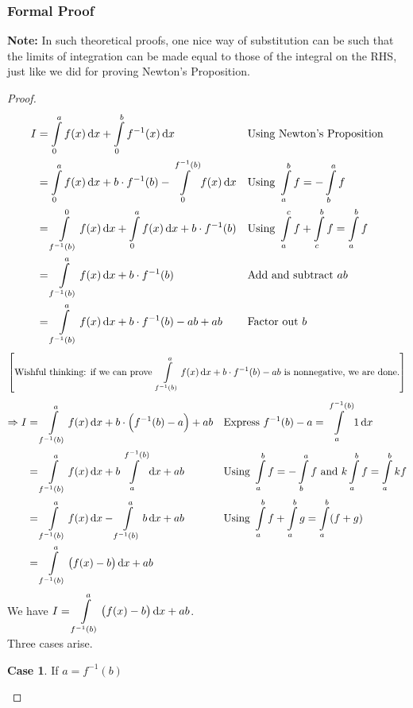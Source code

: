 \documentclass[14]{article}
\theoremstyle{definition}
\theoremstyle{case}
\newtheorem{case}{Case}
\begin{document}
\subsubsection{Formal Proof}
\textbf{Note:} In such theoretical proofs, one nice way of substitution can be such that the limits of integration can be made equal to those of the integral on the RHS, just like we did for proving Newton's Proposition.\\
\begin{proof}
\begin{align*}
I &= \int\limits_0^a f(x) \dif x + \int\limits_0^b f^{-1}(x) \dif x  && \text{Using Newton's Proposition}\\
&= \int\limits_0^a f(x) \dif x + b \cdot f^{-1}(b) - \int\limits_0^{f^{-1}(b)}f(x) \dif x && \text{Using } \int\limits_a^b f = - \int\limits_b^a f\\
&= \int\limits_{f^{-1}(b)}^0 f(x) \dif x + \int\limits_0^a f(x) \dif x + b \cdot f^{-1}(b) && \text{Using } \int\limits_a^c f + \int\limits_c^b f = \int\limits_a^b f\\
&= \int\limits_{f^{-1}(b)}^a f(x) \dif x + b \cdot f^{-1}(b) && \text{Add and subtract } ab\\
&= \int\limits_{f^{-1}(b)}^a f(x) \dif x + b \cdot f^{-1}(b) - ab + ab && \text{Factor out } b
\end{align*}
$\left[ \text{Wishful thinking: if we can prove }\displaystyle\int\limits_{f^{-1}(b)}^a f(x) \dif x + b \cdot f^{-1}(b) - ab \text{ is nonnegative, we are done.} \right]$
\begin{align*}
\Rightarrow I &= \int\limits_{f^{-1}(b)}^a f(x) \dif x + b \cdot \left( f^{-1}(b) - a\right) + ab && \text{Express } f^{-1}(b) - a = \int\limits_a^{f^{-1}(b)}1\dif x\\
&= \int\limits_{f^{-1}(b)}^a f(x) \dif x + b \int\limits_a^{f^{-1}(b)}\dif x + ab && \text{Using } \int\limits_a^b f = - \int\limits_b^a f \text{ and } k \int\limits_a^b f = \int\limits_a^b kf\\
&= \int\limits_{f^{-1}(b)}^a f(x) \dif x - \int\limits_{f^{-1}(b)}^a b \dif x + ab && \text{Using } \int\limits_a^b f + \int\limits_a^b g = \int\limits_a^b (f+g)\\
&= \int\limits_{f^{-1}(b)}^a \left(f(x) - b\right) \dif x + ab
\end{align*}
We have
$I = \displaystyle\int\limits_{f^{-1}(b)}^a \left(f(x) - b\right) \dif x + ab$.\\
Three cases arise.
\begin{case} {If $a = f^{-1}(b)$}\\

\end{case}
\end{proof}
\end{document}
